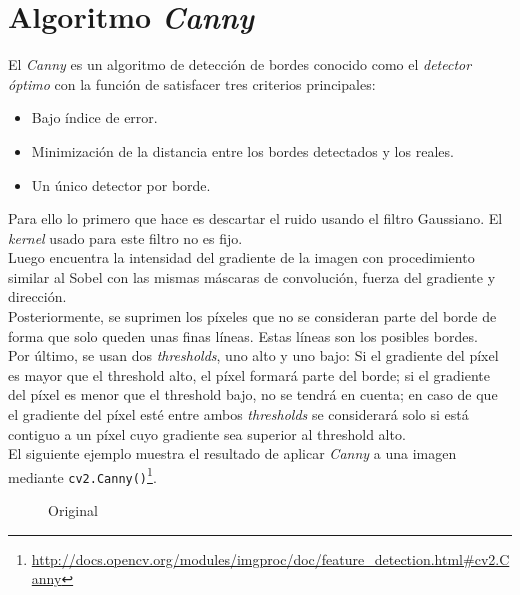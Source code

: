 \section{Algoritmo \emph{Canny}}\label{tecnica:canny}
El \emph{Canny} \emph{\citep*[A computational approach to edge
  detection]{canny1986computational}}
\emph{\citep*[Canny]{opencv_book-bib}} \emph{\citep*[5.1 Edge
  Tracking]{toennies2012guide}} es un algoritmo de detección de bordes
conocido como el \emph{detector óptimo} con la función de satisfacer
tres criterios principales:
\begin{itemize}
\item Bajo índice de error.
\item Minimización de la distancia entre los bordes detectados y los
  reales.
\item Un único detector por borde.
\end{itemize}
Para ello lo primero que hace es descartar el ruido usando el filtro
Gaussiano.
El \emph{kernel} usado para este filtro no es fijo.\\
Luego encuentra la intensidad del gradiente de la imagen con
procedimiento similar al Sobel con las mismas máscaras de convolución,
fuerza del gradiente y dirección.\\
Posteriormente, se suprimen los píxeles que no se consideran parte del
borde de forma que solo queden unas finas líneas. Estas líneas son los posibles bordes.\\
Por último, se usan dos \emph{thresholds}, uno alto y uno bajo: Si el
gradiente del píxel es mayor que el threshold alto, el píxel formará
parte del borde; si el gradiente del píxel es menor que el threshold
bajo, no se tendrá en cuenta; en caso de que el gradiente del píxel
esté entre ambos \emph{thresholds} se considerará solo si está
contiguo a un píxel cuyo gradiente sea superior al threshold alto.\\
El siguiente ejemplo muestra el resultado de aplicar \emph{Canny} a
una imagen mediante
\texttt{cv2.Canny()}\footnote{\url{http://docs.opencv.org/modules/imgproc/doc/feature\_detection.html\#cv2.Canny}}.

\begin{figure}[H]
  \caption{Original}
  \centering \setlength\fboxsep{0pt} \setlength\fboxrule{0.5pt}
\end{figure}


